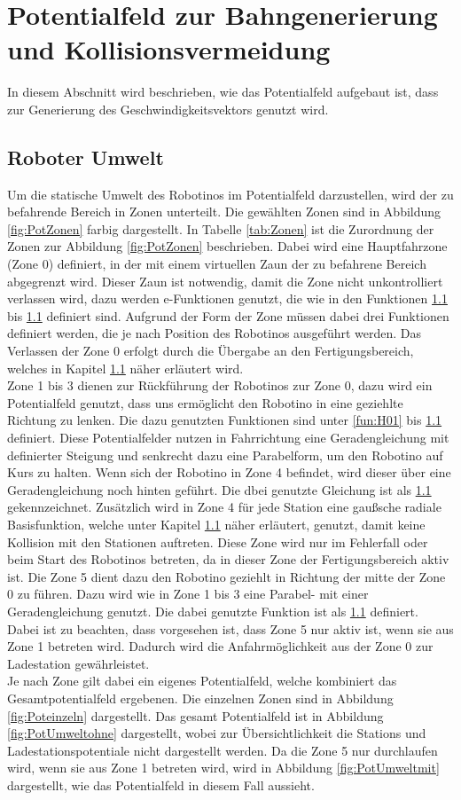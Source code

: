 \section{Potentialfeld zur Bahngenerierung und Kollisionsvermeidung}
\label{sec:Potential}
In diesem Abschnitt wird beschrieben, wie das Potentialfeld aufgebaut ist, dass zur Generierung des Geschwindigkeitsvektors genutzt wird.
\subsection{Roboter Umwelt}
Um die statische Umwelt des Robotinos im Potentialfeld darzustellen, wird der zu befahrende Bereich in Zonen unterteilt. Die gewählten Zonen sind in Abbildung \ref{fig:PotZonen} farbig dargestellt. In Tabelle \ref{tab:Zonen} ist die Zurordnung der Zonen zur Abbildung \ref{fig:PotZonen} beschrieben. Dabei wird eine Hauptfahrzone (Zone 0) definiert, in der mit einem virtuellen Zaun der zu befahrene Bereich abgegrenzt wird. Dieser Zaun ist notwendig, damit die Zone nicht unkontrolliert verlassen wird, dazu werden e-Funktionen genutzt, die wie in den Funktionen \ref{} bis \ref{} definiert sind. Aufgrund der Form der Zone müssen dabei drei Funktionen definiert werden, die je nach Position des Robotinos ausgeführt werden. Das Verlassen der Zone 0 erfolgt durch die Übergabe an den Fertigungsbereich, welches in Kapitel \ref{} näher erläutert wird. \\
Zone 1 bis 3 dienen zur Rückführung der Robotinos zur Zone 0, dazu wird ein Potentialfeld genutzt, dass uns ermöglicht den Robotino in eine geziehlte Richtung zu lenken. Die dazu genutzten Funktionen sind unter \ref{fun:H01} bis \ref{} definiert. Diese Potentialfelder nutzen in Fahrrichtung eine Geradengleichung mit definierter Steigung und senkrecht dazu eine Parabelform, um den Robotino auf Kurs zu halten. Wenn sich der Robotino in Zone 4 befindet, wird dieser über eine Geradengleichung noch hinten geführt. Die dbei genutzte Gleichung ist als \ref{} gekennzeichnet. Zusätzlich wird in Zone 4 für jede Station eine gaußsche radiale Basisfunktion, welche unter Kapitel \ref{} näher erläutert, genutzt, damit keine Kollision mit den Stationen auftreten. Diese Zone wird nur im Fehlerfall oder beim Start des Robotinos betreten, da in dieser Zone der Fertigungsbereich aktiv ist. Die Zone 5 dient dazu den Robotino geziehlt in Richtung der mitte der Zone 0 zu führen. Dazu wird wie in Zone 1 bis 3 eine Parabel- mit einer Geradengleichung genutzt. Die dabei genutzte Funktion ist als \ref{} definiert. Dabei ist zu beachten, dass vorgesehen ist, dass Zone 5 nur aktiv ist, wenn sie aus Zone 1 betreten wird. Dadurch wird die Anfahrmöglichkeit aus der Zone 0 zur Ladestation gewährleistet. \\
Je nach Zone gilt dabei ein eigenes Potentialfeld, welche kombiniert das Gesamtpotentialfeld ergebenen. Die einzelnen Zonen sind in Abbildung \ref{fig:Poteinzeln} dargestellt. Das gesamt Potentialfeld ist in Abbildung \ref{fig:PotUmweltohne} dargestellt, wobei zur Übersichtlichkeit die Stations und Ladestationspotentiale nicht dargestellt werden. Da die Zone 5 nur durchlaufen wird, wenn sie aus Zone 1 betreten wird, wird in Abbildung \ref{fig:PotUmweltmit} dargestellt, wie das Potentialfeld in diesem Fall aussieht.

